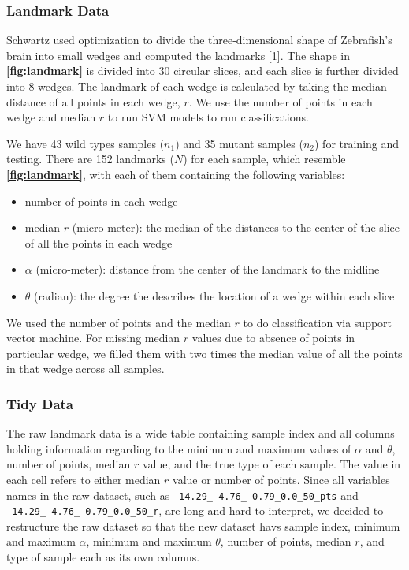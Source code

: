 \documentclass[10pt,letterpaper]{article}
\providecommand{\tightlist}{%
  \setlength{\itemsep}{0pt}\setlength{\parskip}{0pt}}
\begin{document}
\subsubsection{Landmark Data}\label{landmark-data}

Schwartz used optimization to divide the three-dimensional shape of
Zebrafish's brain into small wedges and computed the landmarks {[}1{]}.
The shape in \textbf{\autoref{fig:landmark}} is divided into 30 circular
slices, and each slice is further divided into 8 wedges. The landmark of
each wedge is calculated by taking the median distance of all points in
each wedge, \(r\). We use the number of points in each wedge and median
\(r\) to run SVM models to run classifications.

We have 43 wild types samples (\(n_1\)) and 35 mutant samples (\(n_2\))
for training and testing. There are 152 landmarks (\(N\)) for each
sample, which resemble \textbf{\autoref{fig:landmark}}, with each of
them containing the following variables:

\begin{itemize}
\tightlist
\item
  number of points in each wedge
\item
  median \(r\) (micro-meter): the median of the distances to the center
  of the slice of all the points in each wedge
\item
  \(\alpha\) (micro-meter): distance from the center of the landmark to
  the midline
\item
  \(\theta\) (radian): the degree the describes the location of a wedge
  within each slice
\end{itemize}

We used the number of points and the median \(r\) to do classification
via support vector machine. For missing median \(r\) values due to
absence of points in particular wedge, we filled them with two times the
median value of all the points in that wedge across all samples.

\subsubsection{Tidy Data}\label{tidy-data}

The raw landmark data is a wide table containing sample index and all
columns holding information regarding to the minimum and maximum values
of \(\alpha\) and \(\theta\), number of points, median \(r\) value, and
the true type of each sample. The value in each cell refers to either
median \(r\) value or number of points. Since all variables names in the
raw dataset, such as \texttt{-14.29\_-4.76\_-0.79\_0.0\_50\_pts} and
\texttt{-14.29\_-4.76\_-0.79\_0.0\_50\_r}, are long and hard to
interpret, we decided to restructure the raw dataset so that the new
dataset havs sample index, minimum and maximum \(\alpha\), minimum and
maximum \(\theta\), number of points, median \(r\), and type of sample
each as its own columns.
\end{document}
